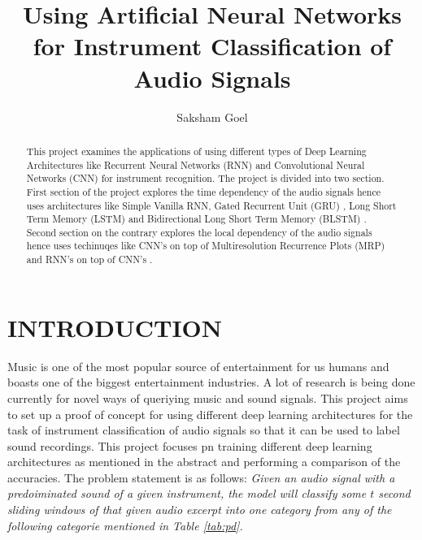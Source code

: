 \documentclass[letterpaper, 12 pt, conference]{ieeeconf}  %
\title{\LARGE \bf
Using Artificial Neural Networks for Instrument Classification of Audio Signals
}
\author{Saksham Goel%
}
\begin{document}
\maketitle
\thispagestyle{empty}
\pagestyle{empty}


\begin{abstract}
This project examines the applications of using different types of Deep Learning Architectures like Recurrent Neural Networks (RNN) and Convolutional Neural Networks (CNN) for instrument recognition. The project is divided into two section. First section of the project explores the time dependency of the audio signals hence uses architectures like Simple Vanilla RNN, Gated Recurrent Unit (GRU) \cite{gru_translation}, Long Short Term Memory (LSTM) \cite{lstm_sequence_modelling} \cite{lstm_music_genre} and Bidirectional Long Short Term Memory (BLSTM) \cite{bidirectional_lstm_speech}. Second section on the contrary explores the local dependency of the audio signals hence uses techinuqes like CNN's on top of Multiresolution Recurrence Plots (MRP) \cite{cnn_music_mrp} and RNN's on top of CNN's \cite{cnn_rnn_sleep_staging}.
\end{abstract}


\section{INTRODUCTION}

Music is one of the most popular source of entertainment for us humans and boasts one of the biggest entertainment industries. A lot of research is being done currently for novel ways of queriying music and sound signals. This project aims to set up a proof of concept for using different deep learning architectures for the task of instrument classification of audio signals so that it can be used to label sound recordings. This project focuses pn training different deep learning architectures as mentioned in the abstract and performing a comparison of the accuracies. The problem statement is as follows: \textit{Given an audio signal with a predoiminated sound of a given instrument, the model will classify some $t$ second sliding windows of that given audio excerpt into one category from any of the following categorie mentioned in Table \ref{tab:pd}.}
\end{document}
